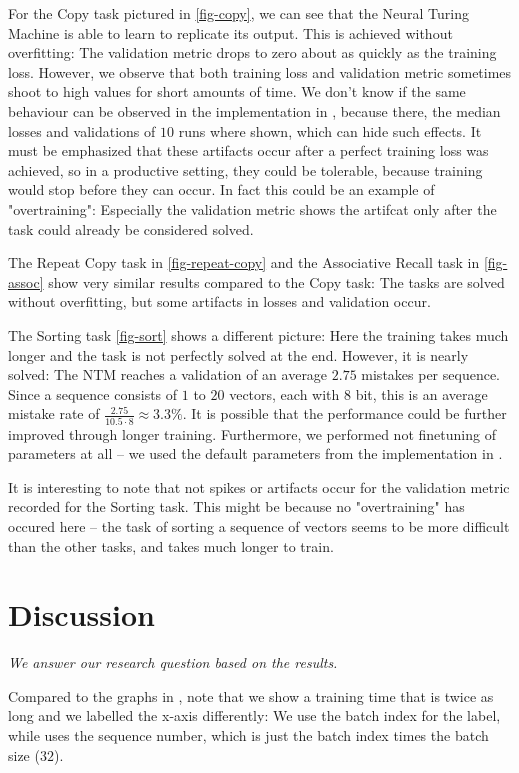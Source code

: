 \documentclass[12pt,twoside]{article}
\theoremstyle{plain}
\theoremstyle{definition}
\theoremstyle{remark}
\begin{document}
For the Copy task pictured in \autoref{fig-copy}, we can see that the Neural Turing Machine is able to learn to replicate its output. This is achieved without overfitting: The validation metric drops to zero about as quickly as the training loss. However, we observe that both training loss and validation metric sometimes shoot to high values for short amounts of time. We don't know if the same behaviour can be observed in the implementation in \cite{implementing-ntm}, because there, the median losses and validations of $10$ runs where shown, which can hide such effects. It must be emphasized that these artifacts occur after a perfect training loss was achieved, so in a productive setting, they could be tolerable, because training would stop before they can occur. In fact this could be an example of "overtraining": Especially the validation metric shows the artifcat only after the task could already be considered solved.

The Repeat Copy task in \autoref{fig-repeat-copy} and the Associative Recall task in \autoref{fig-assoc} show very similar results compared to the Copy task: The tasks are solved without overfitting, but some artifacts in losses and validation occur. 

The Sorting task  \autoref{fig-sort} shows a different picture: Here the training takes much longer and the task is not perfectly solved at the end. However, it is nearly solved: The NTM reaches a validation of an average $2.75$ mistakes per sequence. Since a sequence consists of $1$ to $20$ vectors, each with $8$ bit, this is an average mistake rate of $\frac{2.75}{10.5 \cdot 8} \approx 3.3 \%$. It is possible that the performance could be further improved through longer training. Furthermore, we performed not finetuning of parameters at all -- we used the default parameters from the implementation in \citep{implementing-ntm}.

It is interesting to note that not spikes or artifacts occur for the validation metric recorded for the Sorting task. This might be because no "overtraining" has occured here -- the task of sorting a sequence of vectors seems to be more difficult than the other tasks, and takes much longer to train.

\section{Discussion}
\textit{We answer our research question based on the results.}

Compared to the graphs in \cite{implementing-ntm}, note that we show a training time that is twice as long and we labelled the x-axis differently: We use the batch index for the label, while \cite{implementing-ntm} uses the sequence number, which is just the batch index times the batch size ($32$).
\end{document}
